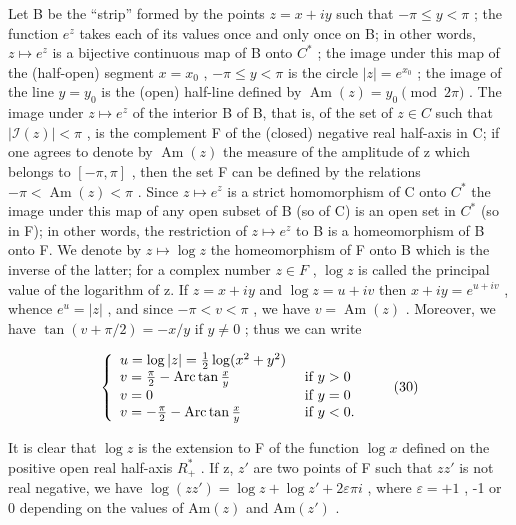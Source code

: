 Let B be the ``strip'' formed by the points \(z = x + iy\) such that \(-\pi \leqslant y < \pi\) ; the function \(e^{z}\) takes each of its values once and only once on B; in other words, \(z \mapsto e^{z}\) is a bijective continuous map of B onto \(C^{*}\) ; the image under this map of the (half-open) segment \(x = x_{0}\) , \(-\pi \leqslant y < \pi\) is the circle \(|z| = e^{x_{0}}\) ; the image of the line \(y = y_{0}\) is the (open) half-line defined by \(\operatorname{Am}(z) = y_{0} \pmod{2\pi}\) . The image under \(z \mapsto e^{z}\) of the interior B of B, that is, of the set of \(z \in C\) such that \(|\mathcal{I}(z)| < \pi\) , is the complement F of the (closed) negative real half-axis in C; if one agrees to denote by \(\operatorname{Am}(z)\) the measure of the amplitude of z which belongs to \([-\pi, \pi]\) , then the set F can be defined by the relations \(-\pi < \operatorname{Am}(z) < \pi\) . Since \(z \mapsto e^{z}\) is a strict homomorphism of C onto \(C^{*}\) the image under this map of any open subset of B (so of C) is an open set in \(C^{*}\) (so in F); in other words, the restriction of \(z \mapsto e^{z}\) to B is a homeomorphism of B onto F. We denote by \(z \mapsto \log z\) the homeomorphism of F onto B which is the inverse of the latter; for a complex number \(z \in F\) , \(\log z\) is called the principal value of the logarithm of z. If \(z = x + iy\) and \(\log z = u + iv\) then \(x + iy = e^{u + iv}\) , whence \(e^{u} = |z|\) , and since \(-\pi < v < \pi\) , we have \(v = \operatorname{Am}(z)\) . Moreover, we have \(\tan(v + \pi/2) = -x/y\) if \(y \neq 0\) ; thus we can write

\[
\left\{ \begin{array}{l l} u = \log | z | = \frac {1}{2} \log (x ^ {2} + y ^ {2}) \\ v = \frac {\pi}{2} - \operatorname{Arc} \tan \frac {x}{y} & \text { if } y > 0 \\ v = 0 & \text { if } y = 0 \\ v = - \frac {\pi}{2} - \operatorname{Arc} \tan \frac {x}{y} & \text { if } y <   0. \end{array} \right.\tag{30}
\]

It is clear that \(\log z\) is the extension to F of the function \(\log x\) defined on the positive open real half-axis \(R_{+}^{*}\) . If z, \(z'\) are two points of F such that \(zz'\) is not real negative, we have \(\log(zz') = \log z + \log z' + 2\varepsilon\pi i\) , where \(\varepsilon = +1\) , -1 or 0 depending on the values of \(\mathrm{Am}(z)\) and \(\mathrm{Am}(z')\) .

